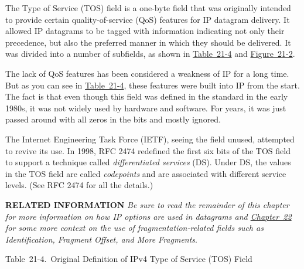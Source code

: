 The
Type of
Service (TOS) field is a one-byte field that was originally intended to
provide certain quality-of-service (QoS) features for IP datagram
delivery. It allowed IP datagrams to be tagged with information
indicating not only their precedence, but also the preferred manner in
which they should be delivered. It was divided into a number of
subfields, as shown in
\protect\hyperlink{ch21s02.htmlux5cux23original_definition_of_ipv_type_of_servi}{Table~21-4}
and
\protect\hyperlink{ch21s02.htmlux5cux23ipv4_datagram_format_this_diagram_shows_}{Figure~21-2}.

The lack of QoS features has been considered a weakness of IP for a long
time. But as you can see in
\protect\hyperlink{ch21s02.htmlux5cux23original_definition_of_ipv_type_of_servi}{Table~21-4},
these features were built into IP from the start. The fact is that even
though this field was defined in the standard in the early 1980s, it was
not widely used by hardware and software. For years, it was just passed
around with all zeros in the bits and mostly ignored.

The Internet Engineering Task Force (IETF), seeing the field unused,
attempted to revive its use. In 1998, RFC 2474 redefined the first six
bits of the TOS field to support a technique called
\emph{differentiated services} (DS). Under DS, the values in the TOS field are called
\emph{codepoints} and are associated with different service levels.
(See RFC 2474 for all the details.)


{\textbf{RELATED INFORMATION}} {\emph{Be sure to read the remainder of
this chapter for more information on how IP options are used in
datagrams and \protect\hyperlink{ch22.html}{Chapter~22} for some more
context on the use of fragmentation-related fields such as
Identification, Fragment Offset, and More Fragments}}.



Table~21-4.~Original Definition of IPv4 Type of Service (TOS) Field

